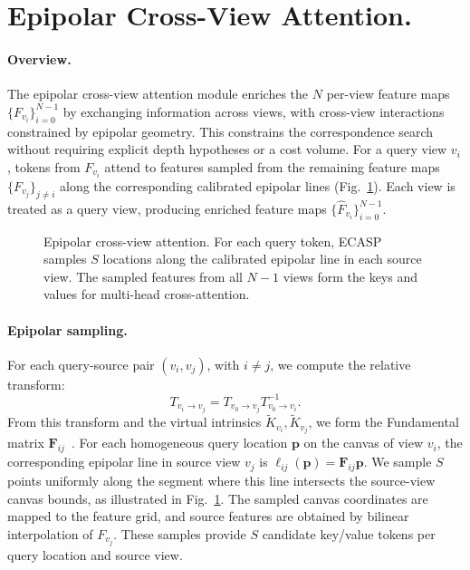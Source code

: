 \section{Epipolar Cross-View Attention.}
\label{sec:fusion}

\paragraph{Overview.}
The epipolar cross-view attention module enriches the \(N\) per-view feature maps \(\{F_{v_i}\}_{i=0}^{N-1}\) by exchanging information across views, with cross-view interactions constrained by epipolar geometry.
This constrains the correspondence search without requiring explicit depth hypotheses or a cost volume.
For a query view \(v_i\), tokens from \(F_{v_i}\) attend to features sampled from the remaining feature maps \(\{F_{v_j}\}_{j\ne i}\) along the corresponding calibrated epipolar lines (Fig.~\ref{fig:epipolar_attention}).
Each view is treated as a query view, producing enriched feature maps \(\{\hat{F}_{v_i}\}_{i=0}^{N-1}\).



\begin{figure}[!htbp]
\centering


\caption{Epipolar cross-view attention. For each query token, ECASP samples \(S\) locations along the calibrated epipolar line in each source view. The sampled features from all \(N-1\) views form the keys and values for multi-head cross-attention.}
\label{fig:epipolar_attention}
\end{figure}

\paragraph{Epipolar sampling.}
For each query-source pair \((v_i,v_j)\), with \(i \neq j\), we compute the relative transform:
\begin{equation}
T_{v_i\rightarrow v_j}=T_{v_0\rightarrow v_j}T_{v_0\rightarrow v_i}^{-1}.
\end{equation}
From this transform and the virtual intrinsics \(\tilde{K}_{v_i},\tilde{K}_{v_j}\),
we form the Fundamental matrix \(\mathbf{F}_{ij}\)~\cite{hartley2004multipleview}.
For each homogeneous query location \(\mathbf{p}\) on the canvas of view \(v_i\), the corresponding epipolar line in source view \(v_j\) is \(\ell_{ij}(\mathbf{p})=\mathbf{F}_{ij}\mathbf{p}\).
We sample \(S\) points uniformly along the segment where this line intersects the source-view canvas bounds, as illustrated in Fig.~\ref{fig:epipolar_attention}.
The sampled canvas coordinates are mapped to the feature grid, and source features are obtained by bilinear interpolation of \(F_{v_j}\).
These samples provide \(S\) candidate key/value tokens per query location and source view.

